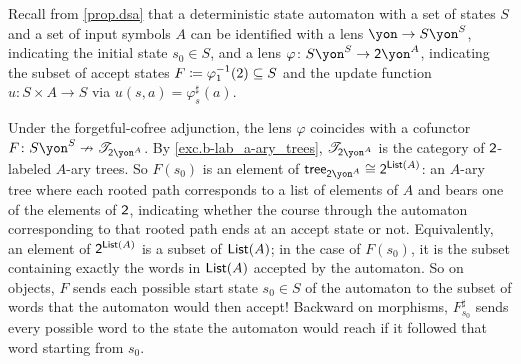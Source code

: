 \documentclass[Book-Poly]{subfiles}
\begin{document}
\begin{example} \label{ex.dsa_lang_recog}
Recall from \cref{prop.dsa} that a deterministic state automaton with a set of states $S$ and a set of input symbols $A$ can be identified with a lens $\yon\to S\yon^S$, indicating the initial state $s_0\in S$, and a lens $\varphi\colon S\yon^S\to\2\yon^A$, indicating the subset of accept states $F\coloneqq\varphi_1^{-1}(2)\ss S$ and the update function $u\colon S\times A\to S$ via $u(s,a)=\varphi^\sharp_s(a)$.

Under the forgetful-cofree adjunction, the lens $\varphi$ coincides with a cofunctor $F\colon S\yon^S\cof\cofree{\2\yon^A}$.
By \cref{exc.b-lab_a-ary_trees}, $\cofree{\2\yon^A}$ is the category of $\2$-labeled $A$-ary trees.
So $F(s_0)$ is an element of $\tr_{\2\yon^A}\iso\2^{\lst(A)}$: an $A$-ary tree where each rooted path corresponds to a list of elements of $A$ and bears one of the elements of $\2$, indicating whether the course through the automaton corresponding to that rooted path ends at an accept state or not.
Equivalently, an element of $\2^{\lst(A)}$ is a subset of $\lst(A)$; in the case of $F(s_0)$, it is the subset containing exactly the words in $\lst(A)$ accepted by the automaton.
So on objects, $F$ sends each possible start state $s_0\in S$ of the automaton to the subset of words that the automaton would then accept!
Backward on morphisms, $F^\sharp_{s_0}$ sends every possible word to the state the automaton would reach if it followed that word starting from $s_0$.
\end{example}
\end{document}
